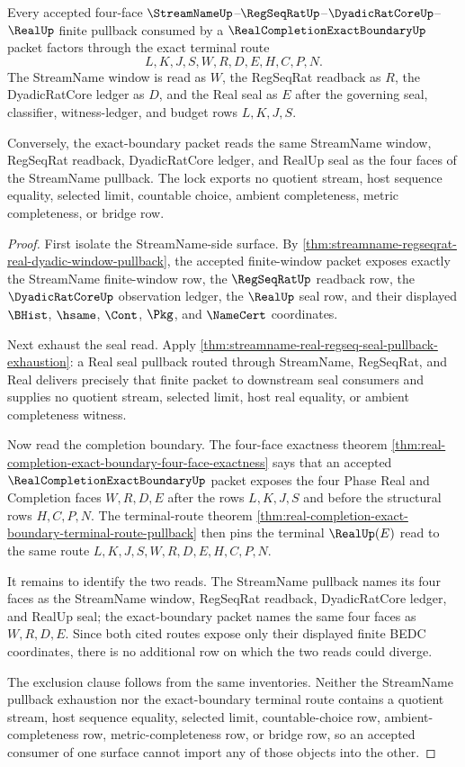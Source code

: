 \begin{theorem}
\label{thm:streamname-realcompletionexactboundary-terminal-pullback-lock}
Every accepted four-face $\StreamNameUp$--$\RegSeqRatUp$--$\DyadicRatCoreUp$--$\RealUp$ finite pullback consumed by a $\RealCompletionExactBoundaryUp$ packet factors through the exact terminal route
$$
L,K,J,S,W,R,D,E,H,C,P,N.
$$
The StreamName window is read as $W$, the RegSeqRat readback as $R$, the DyadicRatCore ledger as $D$, and the Real seal as $E$ after the governing seal, classifier, witness-ledger, and budget rows $L,K,J,S$.

Conversely, the exact-boundary packet reads the same StreamName window, RegSeqRat readback, DyadicRatCore ledger, and RealUp seal as the four faces of the StreamName pullback. The lock exports no quotient stream, host sequence equality, selected limit, countable choice, ambient completeness, metric completeness, or bridge row.
\end{theorem}
\begin{proof}
First isolate the StreamName-side surface. By \autoref{thm:streamname-regseqrat-real-dyadic-window-pullback}, the accepted finite-window packet exposes exactly the StreamName finite-window row, the $\RegSeqRatUp$ readback row, the $\DyadicRatCoreUp$ observation ledger, the $\RealUp$ seal row, and their displayed $\BHist$, $\hsame$, $\Cont$, $\Pkg$, and $\NameCert$ coordinates.

Next exhaust the seal read. Apply \autoref{thm:streamname-real-regseq-seal-pullback-exhaustion}: a Real seal pullback routed through StreamName, RegSeqRat, and Real delivers precisely that finite packet to downstream seal consumers and supplies no quotient stream, selected limit, host real equality, or ambient completeness witness.

Now read the completion boundary. The four-face exactness theorem \autoref{thm:real-completion-exact-boundary-four-face-exactness} says that an accepted $\RealCompletionExactBoundaryUp$ packet exposes the four Phase Real and Completion faces $W,R,D,E$ after the rows $L,K,J,S$ and before the structural rows $H,C,P,N$. The terminal-route theorem \autoref{thm:real-completion-exact-boundary-terminal-route-pullback} then pins the terminal $\RealUp(E)$ read to the same route $L,K,J,S,W,R,D,E,H,C,P,N$.

It remains to identify the two reads. The StreamName pullback names its four faces as the StreamName window, RegSeqRat readback, DyadicRatCore ledger, and RealUp seal; the exact-boundary packet names the same four faces as $W,R,D,E$. Since both cited routes expose only their displayed finite BEDC coordinates, there is no additional row on which the two reads could diverge.

The exclusion clause follows from the same inventories. Neither the StreamName pullback exhaustion nor the exact-boundary terminal route contains a quotient stream, host sequence equality, selected limit, countable-choice row, ambient-completeness row, metric-completeness row, or bridge row, so an accepted consumer of one surface cannot import any of those objects into the other.
\end{proof}

